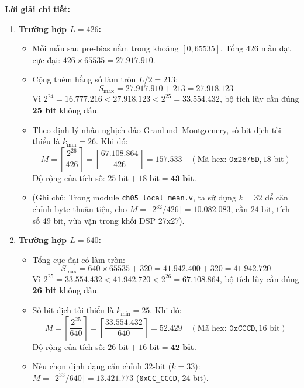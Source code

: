 \textbf{Lời giải chi tiết:}
\begin{enumerate}[label=(\alph*)]
    \item \textbf{Trường hợp $L = 426$:}
    \begin{itemize}[leftmargin=1.5em, itemsep=2pt]
        \item Mỗi mẫu sau pre-bias nằm trong khoảng $[0, 65535]$. Tổng 426 mẫu đạt cực đại: $426 \times 65535 = 27.917.910$.
        \item Cộng thêm hằng số làm tròn $L/2 = 213$:
        \begin{equation}
        S_{\text{max}} = 27.917.910 + 213 = 27.918.123
        \end{equation}
        Vì $2^{24} = 16.777.216 < 27.918.123 < 2^{25} = 33.554.432$, bộ tích lũy cần đúng \textbf{25 bit} không dấu.
        \item Theo định lý nhân nghịch đảo Granlund--Montgomery, số bit dịch tối thiểu là $k_{\min} = 26$. Khi đó:
        \begin{equation}
        M = \left\lceil \frac{2^{26}}{426} \right\rceil = \left\lceil \frac{67.108.864}{426} \right\rceil = \mathbf{157.533} \quad (\text{Mã hex: } \texttt{0x2675D}, 18\text{ bit})
        \end{equation}
        Độ rộng của tích số: $25\text{ bit} + 18\text{ bit} = \mathbf{43\text{ bit}}$.
        \item (Ghi chú: Trong module \texttt{ch05\_local\_mean.v}, ta sử dụng $k = 32$ để căn chỉnh byte thuận tiện, cho $M = \lceil 2^{32}/426 \rceil = 10.082.083$, cần $24\text{ bit}$, tích số 49 bit, vừa vặn trong khối DSP 27x27).
    \end{itemize}

    \item \textbf{Trường hợp $L = 640$:}
    \begin{itemize}[leftmargin=1.5em, itemsep=2pt]
        \item Tổng cực đại có làm tròn:
        \begin{equation}
        S_{\text{max}} = 640 \times 65535 + 320 = 41.942.400 + 320 = 41.942.720
        \end{equation}
        Vì $2^{25} = 33.554.432 < 41.942.720 < 2^{26} = 67.108.864$, bộ tích lũy cần đúng \textbf{26 bit} không dấu.
        \item Số bit dịch tối thiểu là $k_{\min} = 25$. Khi đó:
        \begin{equation}
        M = \left\lceil \frac{2^{25}}{640} \right\rceil = \left\lceil \frac{33.554.432}{640} \right\rceil = \mathbf{52.429} \quad (\text{Mã hex: } \texttt{0xCCCD}, 16\text{ bit})
        \end{equation}
        Độ rộng của tích số: $26\text{ bit} + 16\text{ bit} = \mathbf{42\text{ bit}}$.
        \item Nếu chọn định dạng căn chỉnh 32-bit ($k = 33$): $M = \lceil 2^{33}/640 \rceil = 13.421.773$ (\texttt{0xCC\_CCCD}, 24 bit).
    \end{itemize}


\end{enumerate}
